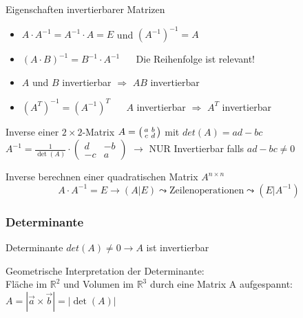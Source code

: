     \begin{theorem}{Eigenschaften invertierbarer Matrizen}
        \begin{itemize}
            \item $A\cdot A^{-1}=A^{-1}\cdot A=E$ und $(A^{-1})^{-1}=A$
            \item ${(A\cdot B)}^{-1}=B^{-1}\cdot A^{-1}$ {\small $\quad$ Die Reihenfolge ist relevant!}
            \item $A$ und $B$ invertierbar $\Rightarrow$ $AB$ invertierbar
            \item ${(A^T)^{-1}}={(A^{-1})}^T$ $\quad$ $A$ invertierbar $\Rightarrow$ $A^T$ invertierbar
        \end{itemize}
    \end{theorem}

\begin{theorem}{Inverse einer $2 \times 2$-Matrix} $A = \begin{psmallmatrix} a & b \\ c & d \end{psmallmatrix}$ mit $det(A) = ad - bc$\\
        $A^{-1} = \frac{1}{\det(A)} \cdot \begin{pmatrix} d & -b \\ -c & a \end{pmatrix}$
        $\rightarrow$ NUR Invertierbar falls $ad - bc \neq 0$
\end{theorem}

\begin{KR}{Inverse berechnen} einer quadratischen Matrix $A^{n \times n}$
    $$A \cdot A^{-1} = E \rightarrow ( A | E ) \leadsto \text{Zeilenoperationen} \leadsto ( E | A^{-1})$$
\end{KR}


\subsubsection{Determinante}

    \begin{definition}{Determinante} $det(A) \neq 0 \rightarrow A$ ist invertierbar
    \end{definition}

    

    \begin{definition}{Geometrische Interpretation} der Determinante:\\
        Fläche im $\mathbb{R}^2$ und Volumen im $\mathbb{R}^3$
        durch eine Matrix A aufgespannt:
        $A = |\vec{a} \times \vec{b}| = |\det(A)|$
    \end{definition}

